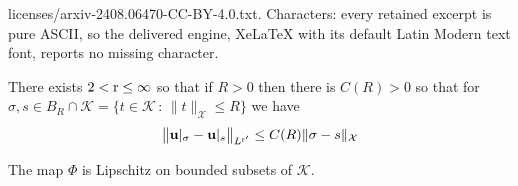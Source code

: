 \documentclass[10pt,a4paper]{amsart}
\newcommand{\bu}{\mathbf{u}}
\newcommand{\cK}{\mathcal{K}}
\newcommand{\cX}{\mathcal{X}}
\newcommand{\rr}{{\text{\textnormal{r}}}}
\begin{document}
licenses/arxiv-2408.06470-CC-BY-4.0.txt. Characters: every retained excerpt is pure ASCII, so the delivered engine, XeLaTeX with its default Latin Modern text font, reports no missing character.
\begin{conjecture} \label{conj:lipschitz}
There exists $2 < \rr \le \infty$ so that if $R>0$ then there is $C(R)>0$ so that for $\sigma,s\in B_R \cap \cK = \{t\in \cK\,:\,\|t\|_{\cX} \le R\}$ we have
\begin{equation}
\big\|\bu|_\sigma - \bu|_s\big\|_{L^{\rr'}} \le C(R) \|\sigma-s\|_{\cX} \label{eq:ulipschitz}
\end{equation}
\end{conjecture}

\begin{lemma} \label{lem:philipschitz}  The map $\Phi$ is Lipschitz on bounded subsets of $\cK$.
\end{lemma}
\end{document}
